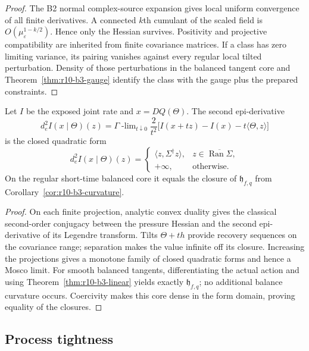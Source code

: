 \begin{proof}
The B2 normal complex-source expansion gives local uniform convergence of all
finite derivatives.  A connected $k$th cumulant of the scaled field is
$O(\mu_\varepsilon^{1-k/2})$.  Hence only the Hessian survives.  Positivity
and projective compatibility are inherited from finite covariance matrices.
If a class has zero limiting variance, its pairing vanishes against every
regular local tilted perturbation.  Density of those perturbations in the
balanced tangent core and Theorem~\ref{thm:r10-b3-gauge} identify the class
with the gauge plus the prepared constraints.
\end{proof}

\begin{theorem}
\label{thm:r10-b3-mosco}
Let $I$ be the exposed joint rate and $x=DQ(\Theta)$.  The second
epi-derivative
\[
 d_e^2I(x\mid\Theta)(z)
 =\Gamma\!\operatorname{-lim}_{t\downarrow0}
 \frac{2}{t^2}
 \bigl[I(x+tz)-I(x)-t\langle\Theta,z\rangle\bigr]
\]
is the closed quadratic form
\[
 d_e^2I(x\mid\Theta)(z)
 =\begin{cases}
 \langle z,\Sigma^\dagger z\rangle,&z\in\overline{\operatorname{Ran}\Sigma},\\
 +\infty,&\text{otherwise}.
 \end{cases}
\]
On the regular short-time balanced core it equals the closure of
$\mathfrak h_{f,q}$ from Corollary~\ref{cor:r10-b3-curvature}.
\end{theorem}

\begin{proof}
On each finite projection, analytic convex duality gives the classical
second-order conjugacy between the pressure Hessian and the second
epi-derivative of its Legendre transform.  Tilts
$\Theta+th$ provide recovery sequences on the covariance range; separation
makes the value infinite off its closure.  Increasing the projections gives
a monotone family of closed quadratic forms and hence a Mosco limit.  For
smooth balanced tangents, differentiating the actual action and using
Theorem~\ref{thm:r10-b3-linear} yields exactly $\mathfrak h_{f,q}$; no
additional balance curvature occurs.  Coercivity makes this core dense in the
form domain, proving equality of the closures.
\end{proof}

\subsection{Process tightness}

